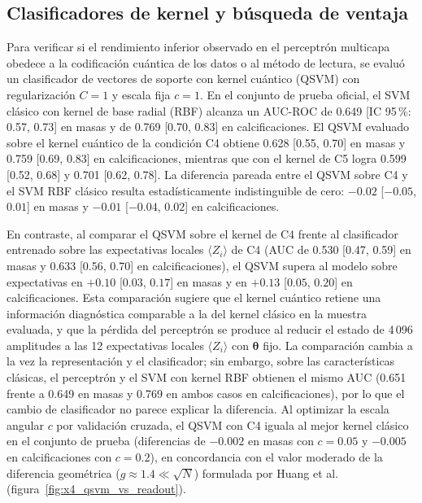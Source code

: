 
\subsection{Clasificadores de kernel y búsqueda de ventaja}
\label{sec:qsvm_ventaja}

Para verificar si el rendimiento inferior observado en el perceptrón multicapa obedece a la codificación cuántica de los datos o al método de lectura, se evaluó un clasificador de vectores de soporte con kernel cuántico (QSVM) con regularización $C = 1$ y escala fija $c = 1$. En el conjunto de prueba oficial, el SVM clásico con kernel de base radial (RBF) alcanza un AUC-ROC de 0.649 [IC 95\,\%: 0.57, 0.73] en masas y de 0.769 [0.70, 0.83] en calcificaciones. El QSVM evaluado sobre el kernel cuántico de la condición C4 obtiene 0.628 [0.55, 0.70] en masas y 0.759 [0.69, 0.83] en calcificaciones, mientras que con el kernel de C5 logra 0.599 [0.52, 0.68] y 0.701 [0.62, 0.78]. La diferencia pareada entre el QSVM sobre C4 y el SVM RBF clásico resulta estadísticamente indistinguible de cero: $-0.02$ [$-0.05$, $0.01$] en masas y $-0.01$ [$-0.04$, $0.02$] en calcificaciones.

En contraste, al comparar el QSVM sobre el kernel de C4 frente al clasificador entrenado sobre las expectativas locales $\langle Z_i \rangle$ de C4 (AUC de 0.530 [0.47, 0.59] en masas y 0.633 [0.56, 0.70] en calcificaciones), el QSVM supera al modelo sobre expectativas en $+0.10$ [$0.03$, $0.17$] en masas y en $+0.13$ [$0.05$, $0.20$] en calcificaciones. Esta comparación sugiere que el kernel cuántico retiene una información diagnóstica comparable a la del kernel clásico en la muestra evaluada, y que la pérdida del perceptrón se produce al reducir el estado de 4\,096 amplitudes a las 12 expectativas locales $\langle Z_i \rangle$ con $\boldsymbol\theta$ fijo. La comparación cambia a la vez la representación y el clasificador; sin embargo, sobre las características clásicas, el perceptrón y el SVM con kernel RBF obtienen el mismo AUC (0.651 frente a 0.649 en masas y 0.769 en ambos casos en calcificaciones), por lo que el cambio de clasificador no parece explicar la diferencia. Al optimizar la escala angular $c$ por validación cruzada, el QSVM con C4 iguala al mejor kernel clásico en el conjunto de prueba (diferencias de $-0.002$ en masas con $c = 0.05$ y $-0.005$ en calcificaciones con $c = 0.2$), en concordancia con el valor moderado de la diferencia geométrica ($g \approx 1.4 \ll \sqrt{N}$) formulada por Huang et al. \cite{huang2021power} (figura~\ref{fig:x4_qsvm_vs_readout}).

